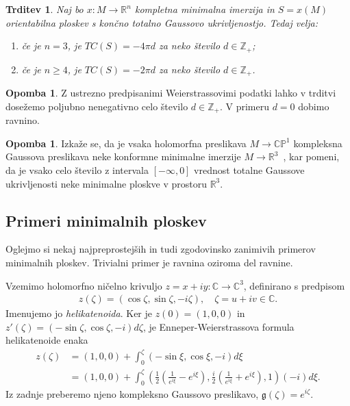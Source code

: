 \documentclass[12pt,a4paper,twoside]{article}
\theoremstyle{definition} %
\newtheorem{opomba}[definicija]{Opomba}
\theoremstyle{plain} %
\newtheorem{trditev}[definicija]{Trditev}
\numberwithin{equation}{section}  %
\newcommand{\R}{\mathbb R}
\newcommand{\Z}{\mathbb Z}
\begin{document}
\begin{trditev}
Naj bo $x \colon M \to \R^{n}$ kompletna minimalna imerzija in $S = x(M)$ orientabilna ploskev s končno totalno Gaussovo ukrivljenostjo. Tedaj velja:
\begin{enumerate}
\item če je $n=3$, je $TC(S) = -4\pi d$ za neko število $d \in \Z_{+}$;
\item če je $n \geq 4$, je $TC(S) = -2\pi d$ za neko število $d \in \Z_{+}$.
\end{enumerate}
\end{trditev}

\begin{opomba}
Z ustrezno predpisanimi Weierstrassovimi podatki lahko v trditvi dosežemo poljubno nenegativno celo število $d \in \Z_{+}$.
V primeru $d=0$ dobimo ravnino.
\end{opomba}

\begin{opomba}
Izkaže se, da je vsaka holomorfna preslikava $M \to \mathbb{CP}^1$ kompleksna Gaussova preslikava neke konformne minimalne imerzije $M \to \R^3$~\cite[Theorem~5.4.1]{alarcon2021minimal}, kar pomeni, da je vsako celo število z intervala $[-\infty, 0]$ vrednost totalne Gaussove ukrivljenosti neke minimalne ploskve v prostoru $\R^3$.
\end{opomba}

\subsection{Primeri minimalnih ploskev}
%
Oglejmo si nekaj najpreprostejših in tudi zgodovinsko zanimivih primerov minimalnih ploskev.
Trivialni primer je ravnina oziroma del ravnine.

Vzemimo holomorfno ničelno krivuljo $z = x + iy \colon \mathbb{C} \to \mathbb{C}^3$, definirano s predpisom
\begin{gather} \label{eq:helikatenoida}
z(\zeta) = (\cos \zeta, \sin \zeta, -i\zeta), \quad \zeta = u + iv \in \mathbb{C}.
\end{gather} 
Imenujemo jo \emph{helikatenoida}.
Ker je $z(0) = (1,0,0)$ in $z'(\zeta) = (-\sin \zeta, \cos \zeta, -i) d\zeta$, je Enneper-Weierstrassova formula helikatenoide enaka
\begin{align} \label{eq:EP-helikatenoida}
z(\zeta) &= (1,0,0) + \int_{0}^{\zeta} (-\sin \xi, \cos \xi, -i) d\xi \nonumber \\
	&= (1,0,0) + \int_{0}^{\zeta} \left( \frac{1}{2} \left(\frac{1}{e^{i\xi}} - e^{i\xi} \right), \frac{i}{2} \left(\frac{1}{e^{i\xi}} + e^{i\xi} \right), 1 \right) (-i) d\xi.
\end{align}
Iz zadnje preberemo njeno kompleksno Gaussovo preslikavo, $\mathfrak{g}(\zeta) = e^{i\zeta}$.
\end{document}
